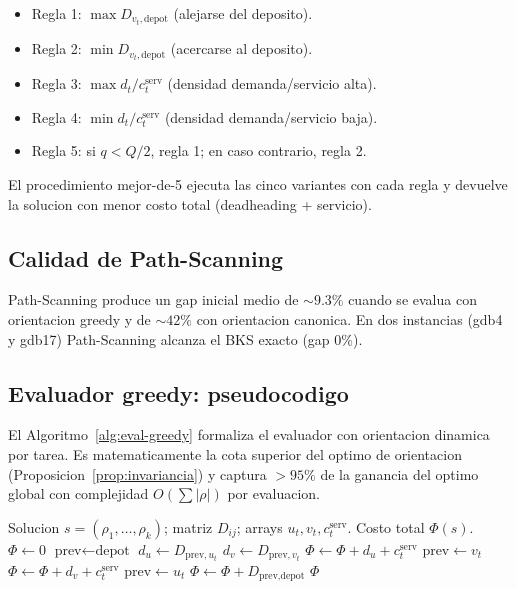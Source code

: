 \begin{itemize}
\item Regla 1: $\max D_{v_t, \text{depot}}$ (alejarse del deposito).
\item Regla 2: $\min D_{v_t, \text{depot}}$ (acercarse al deposito).
\item Regla 3: $\max d_t / c_t^{\text{serv}}$ (densidad demanda/servicio alta).
\item Regla 4: $\min d_t / c_t^{\text{serv}}$ (densidad demanda/servicio baja).
\item Regla 5: si $q < Q/2$, regla 1; en caso contrario, regla 2.
\end{itemize}

El procedimiento mejor-de-5 ejecuta las cinco variantes con cada regla
y devuelve la solucion con menor costo total (deadheading + servicio).

\subsection{Calidad de Path-Scanning}

Path-Scanning produce un gap inicial medio de $\sim 9.3\%$ cuando se
evalua con orientacion greedy y de $\sim 42\%$ con orientacion
canonica. En dos instancias (gdb4 y gdb17) Path-Scanning alcanza el
BKS exacto (gap 0\%).

\subsection{Evaluador greedy: pseudocodigo}

El Algoritmo~\ref{alg:eval-greedy} formaliza el evaluador con
orientacion dinamica por tarea. Es matematicamente la cota superior
del optimo de orientacion (Proposicion~\ref{prop:invariancia}) y
captura $> 95\%$ de la ganancia del optimo global con complejidad
$O(\sum |\rho|)$ por evaluacion.

\begin{algorithm}[h]
\caption{Evaluador greedy con orientacion dinamica por tarea.}
\label{alg:eval-greedy}
\begin{algorithmic}[1]
\Require Solucion $s = (\rho_1, \dots, \rho_k)$; matriz $D_{ij}$;
  arrays $u_t, v_t, c_t^{\text{serv}}$.
\Ensure Costo total $\Phi(s)$.
\State $\Phi \gets 0$
  \State $\text{prev} \gets \text{depot}$
    \State $d_u \gets D_{\text{prev}, u_t}$
    \State $d_v \gets D_{\text{prev}, v_t}$
     
      \State $\Phi \gets \Phi + d_u + c_t^{\text{serv}}$
      \State $\text{prev} \gets v_t$
    \Else {}
      \State $\Phi \gets \Phi + d_v + c_t^{\text{serv}}$
      \State $\text{prev} \gets u_t$
    \EndIf
  \EndFor
  \State $\Phi \gets \Phi + D_{\text{prev}, \text{depot}}$
\EndFor
\State \Return $\Phi$
\end{algorithmic}
\end{algorithm}

